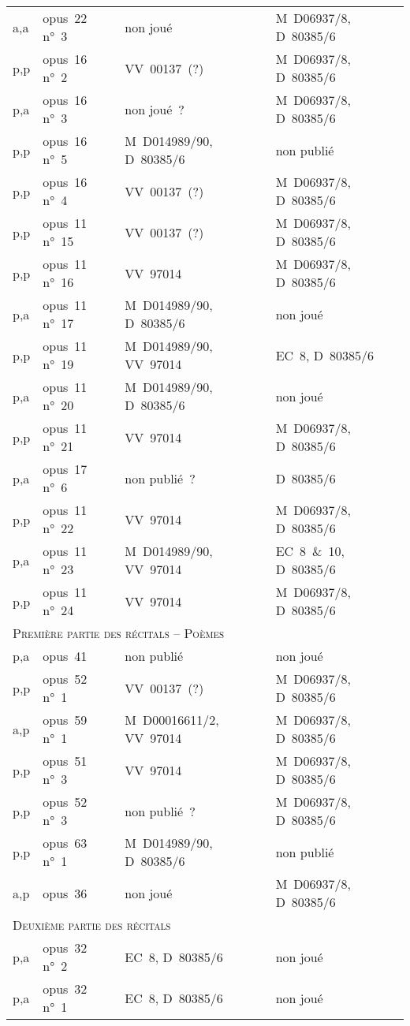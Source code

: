 \begin{longtable}[c]{llll}
 a,a & opus~22 n°~3 & non joué & M~D06937/8, D~80385/6 \\
 p,p & opus~16 n°~2 & VV~00137~(?) & M~D06937/8, D~80385/6 \\
 p,a & opus~16 n°~3 & non joué~? & M~D06937/8, D~80385/6 \\
 p,p & opus~16 n°~5 & M~D014989/90, D~80385/6 & non publié \\
 p,p & opus~16 n°~4 & VV~00137~(?) & M~D06937/8, D~80385/6 \\
 p,p & opus~11 n°~15 & VV~00137~(?) & M~D06937/8, D~80385/6 \\
 p,p & opus~11 n°~16 & VV~97014 & M~D06937/8, D~80385/6 \\
 p,a & opus~11 n°~17 & M~D014989/90, D~80385/6 & non joué \\
 p,p & opus~11 n°~19 & M~D014989/90, VV~97014 & EC~8, D~80385/6 \\
 p,a & opus~11 n°~20 & M~D014989/90, D~80385/6 & non joué \\
 p,p & opus~11 n°~21 & VV~97014 & M~D06937/8, D~80385/6 \\
 p,a & opus~17 n°~6 & non publié~? & D~80385/6 \\
 p,p & opus~11 n°~22 & VV~97014 & M~D06937/8, D~80385/6 \\
 p,a & opus~11 n°~23 & M~D014989/90, VV~97014 & EC~8~\&{}~10, D~80385/6 \\
 p,p & opus~11 n°~24 & VV~97014 & M~D06937/8, D~80385/6 \\ \midrule
 \multicolumn{4}{l}{\textsc{Première partie des récitals -- Poèmes}} \\
 p,a & opus~41 & non publié & non joué \\
 p,p & opus~52 n°~1 & VV~00137~(?) & M~D06937/8, D~80385/6 \\
 a,p & opus~59 n°~1 & M~D00016611/2, VV~97014 & M~D06937/8, D~80385/6 \\
 p,p & opus~51 n°~3 & VV~97014 & M~D06937/8, D~80385/6 \\
 p,p & opus~52 n°~3 & non publié~? & M~D06937/8, D~80385/6 \\
 p,p & opus~63 n°~1 & M~D014989/90, D~80385/6 & non publié \\
 a,p & opus~36 & non joué & M~D06937/8, D~80385/6 \\ \midrule
 \multicolumn{4}{l}{\textsc{Deuxième partie des récitals}} \\
 p,a & opus~32 n°~2 & EC~8, D~80385/6 & non joué \\
 p,a & opus~32 n°~1 & EC~8, D~80385/6 & non joué \\

\end{longtable}
